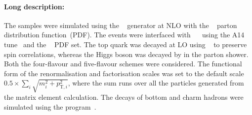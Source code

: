 \paragraph{Long description:}

The \tHq samples were simulated using the \MGNLO[2.3.3]~\cite{Alwall:2014hca}
generator at NLO with the \NNPDF[3.0nlo]~\cite{Ball:2014uwa} parton distribution function~(PDF). The events were interfaced with
\PYTHIA[8.230]~\cite{Sjostrand:2014zea}~ using the A14 tune~\cite{ATL-PHYS-PUB-2014-021} and the \NNPDF[2.3lo]~\cite{Ball:2014uwa} PDF set. 
The top quark was decayed at LO using \MADSPIN~\cite{Frixione:2007zp,Artoisenet:2012st} to preserve spin correlations,
whereas the Higgs boson was decayed by \PYTHIA in the parton shower.
Both the four-flavour and five-flavour schemes were considered.
The functional form of the renormalisation and factorisation scales was set to the 
default scale $0.5\times \sum_i \sqrt{m^2_i+p^2_{\text{T},i}}$, where the sum runs over 
all the particles generated from the matrix element calculation.
The decays of bottom and charm hadrons were simulated using the \EVTGEN program~\cite{Lange:2001uf}.
